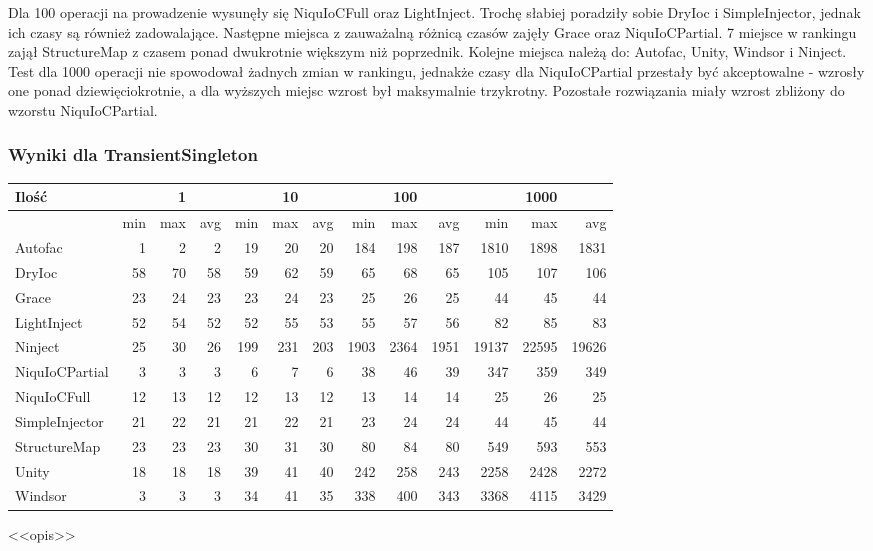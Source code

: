 \documentclass[12pt]{article}
\begin{document}
Dla 100 operacji na prowadzenie wysunęły się NiquIoCFull oraz LightInject. Trochę słabiej poradziły sobie DryIoc i SimpleInjector, jednak ich czasy są również zadowalające. Następne miejsca z zauważalną różnicą czasów zajęły Grace oraz NiquIoCPartial. 7 miejsce w rankingu zajął StructureMap z czasem ponad dwukrotnie większym niż poprzednik. Kolejne miejsca należą do: Autofac, Unity, Windsor i Ninject.\\
Test dla 1000 operacji nie spowodował żadnych zmian w rankingu, jednakże czasy dla NiquIoCPartial przestały być akceptowalne - wzrosły one ponad dziewięciokrotnie, a dla wyższych miejsc wzrost był maksymalnie trzykrotny. Pozostałe rozwiązania miały wzrost zbliżony do wzorstu NiquIoCPartial.

\subsubsection{Wyniki dla TransientSingleton}
\begin{center}
\begin{small}
	\begin{tabular}{ | l | r r r | r r r | r r r | r r r | }
    		\hline
Ilość & & 1 & & & 10 & & & 100 & & & 1000 & \\ \hline
 & min & max & avg & min & max & avg & min & max & avg & min & max & avg \\ \hline
Autofac & 1 & 2 & 2 & 19 & 20 & 20 & 184 & 198 & 187 & 1810 & 1898 & 1831 \\ \hline
DryIoc & 58 & 70 & 58 & 59 & 62 & 59 & 65 & 68 & 65 & 105 & 107 & 106 \\ \hline
Grace & 23 & 24 & 23 & 23 & 24 & 23 & 25 & 26 & 25 & 44 & 45 & 44 \\ \hline
LightInject & 52 & 54 & 52 & 52 & 55 & 53 & 55 & 57 & 56 & 82 & 85 & 83 \\ \hline
Ninject & 25 & 30 & 26 & 199 & 231 & 203 & 1903 & 2364 & 1951 & 19137 & 22595 & 19626 \\ \hline
NiquIoCPartial & 3 & 3 & 3 & 6 & 7 & 6 & 38 & 46 & 39 & 347 & 359 & 349 \\ \hline
NiquIoCFull & 12 & 13 & 12 & 12 & 13 & 12 & 13 & 14 & 14 & 25 & 26 & 25 \\ \hline
SimpleInjector & 21 & 22 & 21 & 21 & 22 & 21 & 23 & 24 & 24 & 44 & 45 & 44 \\ \hline
StructureMap & 23 & 23 & 23 & 30 & 31 & 30 & 80 & 84 & 80 & 549 & 593 & 553 \\ \hline
Unity & 18 & 18 & 18 & 39 & 41 & 40 & 242 & 258 & 243 & 2258 & 2428 & 2272 \\ \hline
Windsor & 3 & 3 & 3 & 34 & 41 & 35 & 338 & 400 & 343 & 3368 & 4115 & 3429 \\ \hline
  	\end{tabular}
\end{small}
\end{center}
<<opis>>
\end{document}
